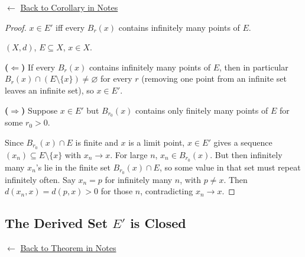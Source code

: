 \begin{remark*}[Return]
$\leftarrow$ \hyperref[cor:inf-nbhd]{Back to Corollary in Notes}
\end{remark*}

\begin{proof}
\Claim $x \in E'$ iff every $B_r(x)$ contains infinitely many points of $E$.

\Given $(X,d)$, $E \subseteq X$, $x \in X$.

\medskip
\noindent\textbf{($\Leftarrow$)} If every $B_r(x)$ contains infinitely many points of $E$,
then in particular $B_r(x) \cap (E \setminus \{x\}) \neq \varnothing$ for every $r$
(removing one point from an infinite set leaves an infinite set), so $x \in E'$.

\medskip
\noindent\textbf{($\Rightarrow$)} Suppose $x \in E'$
but $B_{r_0}(x)$ contains only finitely many points of $E$ for some $r_0 > 0$.

Since $B_{r_0}(x) \cap E$ is finite and $x$ is a limit point, $x \in E'$ gives
a sequence $(x_n) \subseteq E \setminus \{x\}$ with $x_n \to x$.
For large $n$, $x_n \in B_{r_0}(x)$.
But then infinitely many $x_n$'s lie in the finite set $B_{r_0}(x) \cap E$,
so some value in that set must repeat infinitely often.
Say $x_n = p$ for infinitely many $n$, with $p \neq x$.
Then $d(x_n, x) = d(p, x) > 0$ for those $n$, contradicting $x_n \to x$.
\end{proof}

\subsection*{The Derived Set $E'$ is Closed}
\label{prf:derived-closed}

\begin{remark*}[Return]
$\leftarrow$ \hyperref[thm:derived-closed]{Back to Theorem in Notes}
\end{remark*}

